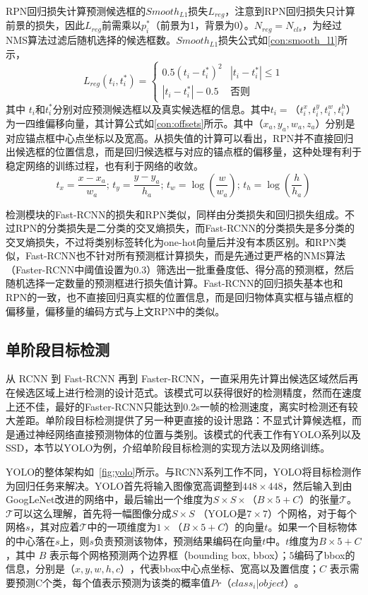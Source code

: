 RPN回归损失计算预测候选框的$Smooth_{L1}$损失$L_{reg}$，注意到RPN回归损失只计算前景的损失，因此$L_{reg}$前需乘以$p^*_i$（前景为1，背景为0）。$N_{reg} = N_{cls}$，为经过NMS算法过滤后随机选择的候选框数。$Smooth_{L1}$损失公式如\ref{con:smooth_l1}所示，
\begin{equation}
L_{reg}(t_i,t^*_i) = 
\begin{cases}
0.5(t_i-t^*_i)^2 & |t_i-t^*_i| \leq 1 \\
|t_i-t^*_i| - 0.5 & \text{否则}
\end{cases}
\label{con:smooth_l1}
\end{equation}
其中 $t_i$和$t^*_i$分别对应预测候选框以及真实候选框的信息。其中$t_i = （t^x_i, t^y_i,t^w_i,t^h_i）$ 为一四维偏移向量，其计算公式如\ref{con:offsets}所示。其中$（x_a,y_a,w_a,z_a）$分别是对应锚点框中心点坐标以及宽高。从损失值的计算可以看出，RPN并不直接回归出候选框的位置信息，而是回归候选框与对应的锚点框的偏移量，这种处理有利于稳定网络的训练过程，也有利于网络的收敛。
\begin{equation}
t_x = \frac{x - x_{a}}{w_{a}}; \, t_y = \frac{y - y_{a}}{h_{a}}; \,
t_w = \log(\frac{w}{w_{a}}); \, t_h = \log(\frac{h}{h_{a}})
\label{con:offsets}
\end{equation}

检测模块的Fast-RCNN的损失和RPN类似，同样由分类损失和回归损失组成。不过RPN的分类损失是二分类的交叉熵损失，而Fast-RCNN的分类损失是多分类的交叉熵损失，不过将类别标签转化为one-hot向量后并没有本质区别。和RPN类似，Fast-RCNN也不针对所有预测框计算损失，而是先通过更严格的NMS算法（Faster-RCNN中阈值设置为0.3）筛选出一批重叠度低、得分高的预测框，然后随机选择一定数量的预测框进行损失值计算。Fast-RCNN的回归损失基本也和RPN的一致，也不直接回归真实框的位置信息，而是回归物体真实框与锚点框的偏移量，偏移量的编码方式与上文RPN中的类似。

\subsection{单阶段目标检测}
\label{one-stage}
从 RCNN 到 Fast-RCNN 再到 Faster-RCNN，一直采用先计算出候选区域然后再在候选区域上进行检测的设计范式。该模式可以获得很好的检测精度，然而在速度上还不佳，最好的Faster-RCNN只能达到0.2s一帧的检测速度，离实时检测还有较大差距。单阶段目标检测提供了另一种更直接的设计思路：不显式计算候选框，而是通过神经网络直接预测物体的位置与类别。该模式的代表工作有YOLO系列以及SSD，本节以YOLO为例，介绍单阶段目标检测的实现方法以及网络训练。




YOLO的整体架构如\figurename \, \ref{fig:yolo}所示。与RCNN系列工作不同，YOLO将目标检测作为回归任务来解决。YOLO首先将输入图像宽高调整到$448 \times 448$，然后输入到由GoogLeNet改进的网络中，最后输出一个维度为$S \times S \times （B \times 5 + C）$的张量$\mathcal{T}$。$\mathcal{T}$可以这么理解，首先将一幅图像分成$S \times S$ （YOLO是$7\times 7$）个网格，对于每个网格$s$，其对应着$\mathcal{T}$中的一项维度为$1 \times （B \times 5 + C）$的向量$t$。如果一个目标物体的中心落在$s$上，则$s$负责预测该物体，预测结果编码在向量$t$中。$t$维度为$B \times 5 + C$，其中 $B$ 表示每个网格预测两个边界框（bounding box, bbox）；$5$编码了bbox的信息，分别是$（x,y,w,h,c）$，代表bbox中心点坐标、宽高以及置信度；$C$ 表示需要预测C个类，每个值表示预测为该类的概率值$Pr（class_i|object）$。

